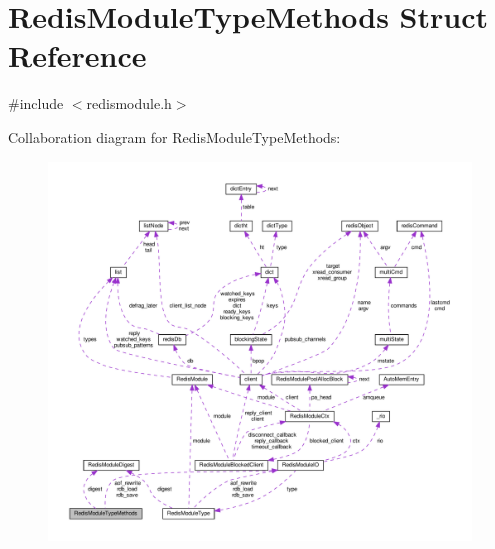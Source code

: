 \hypertarget{struct_redis_module_type_methods}{}\section{Redis\+Module\+Type\+Methods Struct Reference}
\label{struct_redis_module_type_methods}


{\ttfamily \#include $<$redismodule.\+h$>$}



Collaboration diagram for Redis\+Module\+Type\+Methods\+:
\nopagebreak
\begin{figure}[H]
\begin{center}
\leavevmode
\includegraphics[width=350pt]{struct_redis_module_type_methods__coll__graph}
\end{center}
\end{figure}
